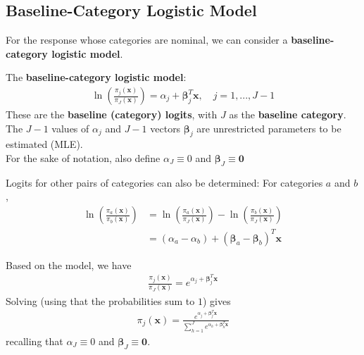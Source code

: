 \documentclass[11pt]{elegantbook}
\begin{document}
\subsection{Baseline-Category Logistic Model}
For the response whose categories are nominal, we can consider a \textbf{baseline-category logistic model}.
\begin{definition}
    \normalfont
    The \textbf{baseline-category logistic model}:
    \begin{equation}
        \begin{aligned}
            \ln\left(\frac{\pi_{j}(\boldsymbol{x})}{\pi_J(\boldsymbol{x})}\right)=\alpha_j+\boldsymbol{\beta}_j^T \boldsymbol{x},\quad j=1,...,J-1
        \end{aligned}
        \nonumber
    \end{equation}
    These are the \textbf{baseline (category) logits}, with $J$ as the \textbf{baseline category}.\\
    The $J-1$ values of $\alpha_j$ and $J-1$ vectors $\boldsymbol{\beta}_j$ are unrestricted parameters to be estimated (MLE).\\
    For the sake of notation, also define $\alpha_J\equiv0$ and $\boldsymbol{\beta}_J\equiv \boldsymbol{0}$
\end{definition}
Logits for other pairs of categories can also be determined: For categories $a$ and $b$,
\begin{equation}
    \begin{aligned}
        \ln\left(\frac{\pi_{a}(\boldsymbol{x})}{\pi_b(\boldsymbol{x})}\right)&=\ln\left(\frac{\pi_{a}(\boldsymbol{x})}{\pi_J(\boldsymbol{x})}\right)-\ln\left(\frac{\pi_{b}(\boldsymbol{x})}{\pi_J(\boldsymbol{x})}\right)\\
        &=(\alpha_a-\alpha_b)+(\boldsymbol{\beta}_a-\boldsymbol{\beta}_b)^T \boldsymbol{x}
    \end{aligned}
    \nonumber
\end{equation}

Based on the model, we have
\begin{equation}
    \begin{aligned}
        \frac{\pi_{j}(\boldsymbol{x})}{\pi_J(\boldsymbol{x})}=e^{\alpha_j+\boldsymbol{\beta}_j^T \boldsymbol{x}}
    \end{aligned}
    \nonumber
\end{equation}
Solving (using that the probabilities sum to $1$) gives
\begin{equation}
    \begin{aligned}
        \pi_{j}(\boldsymbol{x})=\frac{e^{\alpha_j+\boldsymbol{\beta}_j^T \boldsymbol{x}}}{\sum_{h=1}^J e^{\alpha_h+\boldsymbol{\beta}_h^T \boldsymbol{x}}}
    \end{aligned}
    \nonumber
\end{equation}
recalling that $\alpha_J\equiv0$ and $\boldsymbol{\beta}_J\equiv \boldsymbol{0}$.
\end{document}
